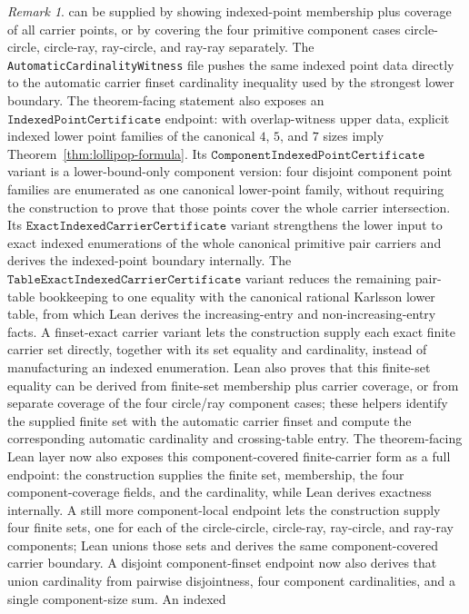 \documentclass[12pt]{article}
\theoremstyle{plain}
\theoremstyle{definition}
\theoremstyle{remark}
\newtheorem{remark}[theorem]{Remark}
\begin{document}
\begin{remark}
can be supplied by showing indexed-point membership plus coverage of all
carrier points, or by covering the four primitive component cases
circle-circle, circle-ray, ray-circle, and ray-ray separately.  The
\texttt{AutomaticCardinalityWitness} file pushes
the same indexed point data directly to the automatic carrier finset
cardinality inequality used by the strongest lower boundary.  The
theorem-facing statement also exposes an
\(\texttt{IndexedPointCertificate}\) endpoint: with overlap-witness upper data,
explicit indexed lower point families of the canonical \(4\), \(5\), and \(7\)
sizes imply Theorem~\ref{thm:lollipop-formula}.  Its
\(\texttt{ComponentIndexedPointCertificate}\) variant is a lower-bound-only
component version: four disjoint component point families are enumerated as
one canonical lower-point family, without requiring the construction to prove
that those points cover the whole carrier intersection.  Its
\(\texttt{ExactIndexedCarrierCertificate}\) variant strengthens the lower
input to exact indexed enumerations of the whole canonical primitive pair
carriers and derives the indexed-point boundary internally.  The
\(\texttt{TableExactIndexedCarrierCertificate}\) variant reduces the
remaining pair-table bookkeeping to one equality with the canonical rational
Karlsson lower table, from which Lean derives the increasing-entry and
non-increasing-entry facts.  A finset-exact carrier variant lets the
construction supply each exact finite carrier set directly, together with
its set equality and cardinality, instead of manufacturing an indexed
enumeration.  Lean also proves that this finite-set equality can be derived
from finite-set membership plus carrier coverage, or from separate coverage
of the four circle/ray component cases; these helpers identify the supplied
finite set with the automatic carrier finset and compute the corresponding
automatic cardinality and crossing-table entry.  The theorem-facing Lean
layer now also exposes this component-covered finite-carrier form as a full
endpoint: the construction supplies the finite set, membership, the four
component-coverage fields, and the cardinality, while Lean derives exactness
internally.  A still more component-local endpoint lets the construction
supply four finite sets, one for each of the circle-circle, circle-ray,
ray-circle, and ray-ray components; Lean unions those sets and derives the
same component-covered carrier boundary.  A disjoint component-finset
endpoint now also derives that union cardinality from pairwise disjointness,
four component cardinalities, and a single component-size sum.  An indexed

\end{remark}
\end{document}
